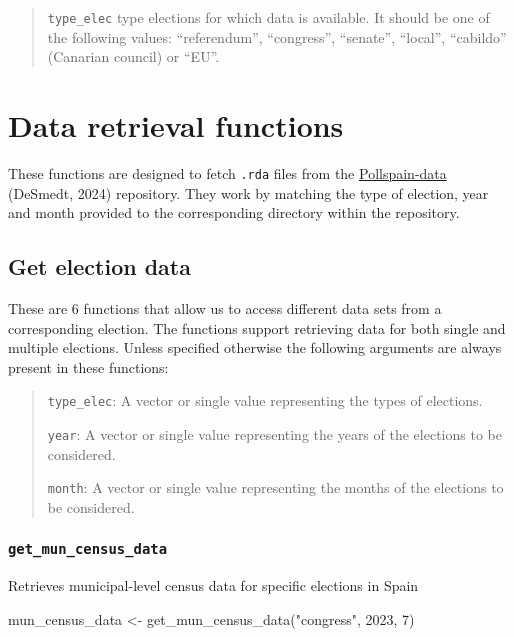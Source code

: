 \documentclass[
  letterpaper,
  DIV=11,
  numbers=noendperiod]{scrreprt}
\newenvironment{Shaded}{\begin{snugshade}}{\end{snugshade}}
\newcommand{\DecValTok}[1]{\textcolor[rgb]{0.68,0.00,0.00}{#1}}
\newcommand{\FunctionTok}[1]{\textcolor[rgb]{0.28,0.35,0.67}{#1}}
\newcommand{\NormalTok}[1]{\textcolor[rgb]{0.00,0.23,0.31}{#1}}
\newcommand{\OtherTok}[1]{\textcolor[rgb]{0.00,0.23,0.31}{#1}}
\newcommand{\StringTok}[1]{\textcolor[rgb]{0.13,0.47,0.30}{#1}}
\begin{document}
\begin{quote}
\texttt{type\_elec} type elections for which data is available. It
should be one of the following values: ``referendum'', ``congress'',
``senate'', ``local'', ``cabildo'' (Canarian council) or ``EU''.
\end{quote}

\hypertarget{data-retrieval-functions}{%
\section{Data retrieval functions}\label{data-retrieval-functions}}

These functions are designed to fetch \texttt{.rda} files from the
\href{https://github.com/mikadsr/Pollspain-data}{Pollspain-data}
(DeSmedt, 2024) repository. They work by matching the type of election,
year and month provided to the corresponding directory within the
repository.

\hypertarget{get-election-data}{%
\subsection{Get election data}\label{get-election-data}}

These are 6 functions that allow us to access different data sets from a
corresponding election. The functions support retrieving data for both
single and multiple elections. Unless specified otherwise the following
arguments are always present in these functions:

\begin{quote}
\texttt{type\_elec}: A vector or single value representing the types of
elections.

\texttt{year}: A vector or single value representing the years of the
elections to be considered.

\texttt{month}: A vector or single value representing the months of the
elections to be considered.
\end{quote}

\hypertarget{get_mun_census_data}{%
\subsubsection{\texorpdfstring{\texttt{get\_mun\_census\_data}}{get\_mun\_census\_data}}\label{get_mun_census_data}}

Retrieves municipal-level census data for specific elections in Spain

\begin{Shaded}
\begin{Highlighting}[]
\NormalTok{mun\_census\_data }\OtherTok{\textless{}{-}} \FunctionTok{get\_mun\_census\_data}\NormalTok{(}\StringTok{"congress"}\NormalTok{, }\DecValTok{2023}\NormalTok{, }\DecValTok{7}\NormalTok{)}
\end{Highlighting}
\end{Shaded}
\end{document}
